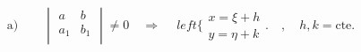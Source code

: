 \documentclass[preview]{standalone}
\begin{document}
\begin{align*}
\text{a)}\qquad\begin{vmatrix}

a &     b\\

        a_1 &                              b_1\\

\end{vmatrix}\neq0\quad\Rightarrow\quad\                             left\{\begin{array}{l}

        x=\xi+h\\

                               y=\eta+k

\end{array}\big.\quad,\quad                              h,k=\text{cte.}
\end{align*}
\end{document}
